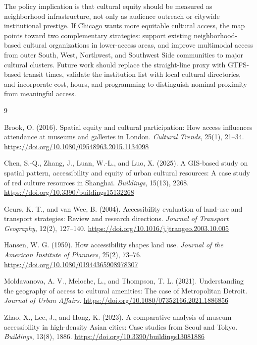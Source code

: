 \documentclass[11pt]{article}
\begin{document}
The policy implication is that cultural equity should be measured as neighborhood infrastructure, not only as audience outreach or citywide institutional prestige. If Chicago wants more equitable cultural access, the map points toward two complementary strategies: support existing neighborhood-based cultural organizations in lower-access areas, and improve multimodal access from outer South, West, Northwest, and Southwest Side communities to major cultural clusters. Future work should replace the straight-line proxy with GTFS-based transit times, validate the institution list with local cultural directories, and incorporate cost, hours, and programming to distinguish nominal proximity from meaningful access.

\begin{thebibliography}{9}

Brook, O. (2016).
\newblock Spatial equity and cultural participation: How access influences attendance at museums and galleries in London.
\newblock \textit{Cultural Trends}, 25(1), 21--34. \url{https://doi.org/10.1080/09548963.2015.1134098}

Chen, S.-Q., Zhang, J., Luan, W.-L., and Luo, X. (2025).
\newblock A GIS-based study on spatial pattern, accessibility and equity of urban cultural resources: A case study of red culture resources in Shanghai.
\newblock \textit{Buildings}, 15(13), 2268. \url{https://doi.org/10.3390/buildings15132268}

Geurs, K. T., and van Wee, B. (2004).
\newblock Accessibility evaluation of land-use and transport strategies: Review and research directions.
\newblock \textit{Journal of Transport Geography}, 12(2), 127--140. \url{https://doi.org/10.1016/j.jtrangeo.2003.10.005}

Hansen, W. G. (1959).
\newblock How accessibility shapes land use.
\newblock \textit{Journal of the American Institute of Planners}, 25(2), 73--76. \url{https://doi.org/10.1080/01944365908978307}

Moldavanova, A. V., Meloche, L., and Thompson, T. L. (2021).
\newblock Understanding the geography of access to cultural amenities: The case of Metropolitan Detroit.
\newblock \textit{Journal of Urban Affairs}. \url{https://doi.org/10.1080/07352166.2021.1886856}

Zhao, X., Lee, J., and Hong, K. (2023).
\newblock A comparative analysis of museum accessibility in high-density Asian cities: Case studies from Seoul and Tokyo.
\newblock \textit{Buildings}, 13(8), 1886. \url{https://doi.org/10.3390/buildings13081886}


\end{thebibliography}
\end{document}
